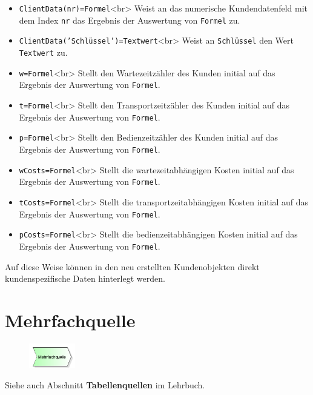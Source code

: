 \begin{itemize}
  \item \texttt{ClientData(nr)=Formel}<br>
  Weist an das numerische Kundendatenfeld mit dem Index \texttt{nr} das Ergebnis der
  Auswertung von \texttt{Formel} zu. 
  \item \texttt{ClientData('Schlüssel')=Textwert}<br>
  Weist an \texttt{Schlüssel} den Wert \texttt{Textwert} zu. 
  \item \texttt{w=Formel}<br>
  Stellt den Wartezeitzähler des Kunden initial auf das Ergebnis der
  Auswertung von \texttt{Formel}.   
  \item \texttt{t=Formel}<br>
  Stellt den Transportzeitzähler des Kunden initial auf das Ergebnis der
  Auswertung von \texttt{Formel}. 
  \item \texttt{p=Formel}<br>
  Stellt den Bedienzeitzähler des Kunden initial auf das Ergebnis der
  Auswertung von \texttt{Formel}. 
  \item \texttt{wCosts=Formel}<br>
  Stellt die wartezeitabhängigen Kosten initial auf das Ergebnis der
  Auswertung von \texttt{Formel}. 
  \item \texttt{tCosts=Formel}<br>
  Stellt die transportzeitabhängigen Kosten initial auf das Ergebnis der
  Auswertung von \texttt{Formel}. 
  \item \texttt{pCosts=Formel}<br>
  Stellt die bedienzeitabhängigen Kosten initial auf das Ergebnis der
  Auswertung von \texttt{Formel}. 
\end{itemize}

Auf diese Weise können in den neu erstellten Kundenobjekten direkt kundenspezifische Daten
hinterlegt werden. 


\section{Mehrfachquelle}
\label{ref:ModelElementSourceMulti}

\begin{figure}
\vspace{-22pt}
\includegraphics[width=2cm]{imageModelElementSourceMulti.png}
\vspace{-22pt}
\end{figure}

Siehe auch Abschnitt \textbf{Tabellenquellen} im Lehrbuch.

